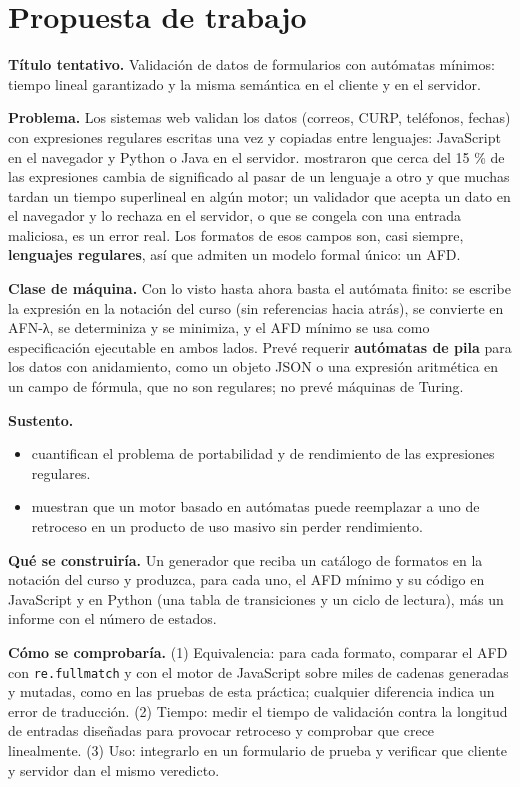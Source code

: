 \hypertarget{propuesta-de-trabajo}{%
\section{Propuesta de trabajo}\label{propuesta-de-trabajo}}

\textbf{Título tentativo.} Validación de datos de formularios con autómatas mínimos: tiempo lineal garantizado y la misma semántica en el cliente y en el servidor.

\textbf{Problema.} Los sistemas web validan los datos (correos, CURP, teléfonos, fechas) con expresiones regulares escritas una vez y copiadas entre lenguajes: JavaScript en el navegador y Python o Java en el servidor. \textcite{davis2019} mostraron que cerca del 15 \% de las expresiones cambia de significado al pasar de un lenguaje a otro y que muchas tardan un tiempo superlineal en algún motor; un validador que acepta un dato en el navegador y lo rechaza en el servidor, o que se congela con una entrada maliciosa, es un error real. Los formatos de esos campos son, casi siempre, \textbf{lenguajes regulares}, así que admiten un modelo formal único: un AFD.

\textbf{Clase de máquina.} Con lo visto hasta ahora basta el autómata finito: se escribe la expresión en la notación del curso (sin referencias hacia atrás), se convierte en AFN-λ, se determiniza y se minimiza, y el AFD mínimo se usa como especificación ejecutable en ambos lados. Prevé requerir \textbf{autómatas de pila} para los datos con anidamiento, como un objeto JSON o una expresión aritmética en un campo de fórmula, que no son regulares; no prevé máquinas de Turing.

\textbf{Sustento.}

\begin{itemize}
\tightlist
\item
  \textcite{davis2019} cuantifican el problema de portabilidad y de rendimiento de las expresiones regulares.
\item
  \textcite{moseley2023} muestran que un motor basado en autómatas puede reemplazar a uno de retroceso en un producto de uso masivo sin perder rendimiento.
\end{itemize}

\textbf{Qué se construiría.} Un generador que reciba un catálogo de formatos en la notación del curso y produzca, para cada uno, el AFD mínimo y su código en JavaScript y en Python (una tabla de transiciones y un ciclo de lectura), más un informe con el número de estados.

\textbf{Cómo se comprobaría.} (1) Equivalencia: para cada formato, comparar el AFD con \texttt{re.fullmatch} y con el motor de JavaScript sobre miles de cadenas generadas y mutadas, como en las pruebas de esta práctica; cualquier diferencia indica un error de traducción. (2) Tiempo: medir el tiempo de validación contra la longitud de entradas diseñadas para provocar retroceso y comprobar que crece linealmente. (3) Uso: integrarlo en un formulario de prueba y verificar que cliente y servidor dan el mismo veredicto.
